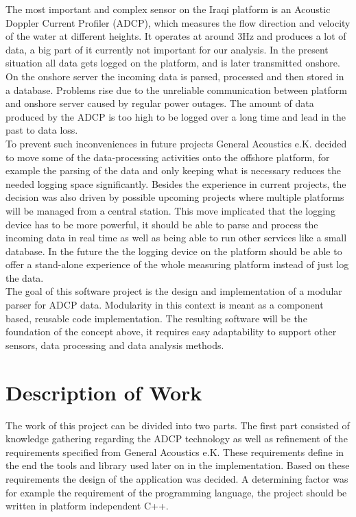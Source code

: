 The most important and complex sensor on the Iraqi platform is an Acoustic Doppler Current Profiler (ADCP), which measures the flow direction and velocity of the water at different heights. It operates at around 3Hz and produces a lot of data, a big part of it currently not important for our analysis. In the present situation all data gets logged on the platform, and is later transmitted onshore. On the onshore server the incoming data is parsed, processed and then stored in a database. Problems rise due to the unreliable communication between platform and onshore server caused by regular power outages. The amount of data produced by the ADCP is too high to be logged over a long time and lead in the past to data loss.\\\newline
To prevent such inconveniences in future projects General Acoustics e.K. decided to move some of the data-processing activities onto the offshore platform, for example the parsing of the data and only keeping what is necessary reduces the needed logging space significantly. Besides the experience in current projects, the decision was also driven by possible upcoming projects where multiple platforms will be managed from a central station. This move implicated that the logging device has to be more powerful, it should be able to parse and process the incoming data in real time as well as being able to run other services like a small database. In the future the the logging device on the platform should be able to offer a stand-alone experience of the whole measuring platform instead of just log the data.\\\newline
The goal of this software project is the design and implementation of a modular parser for ADCP data. Modularity in this context is meant as a component based, reusable code implementation. The resulting software will be the foundation of the concept above, it requires easy adaptability to support other sensors, data processing and data analysis methods. 

\section{Description of Work}
The work of this project can be divided into two parts. The first part consisted of knowledge gathering regarding the ADCP technology as well as refinement of the requirements specified from General Acoustics e.K. These requirements define in the end the tools and library used later on in the implementation. Based on these requirements the design of the application was decided. A determining factor was for example the requirement of the programming language, the project should be written in platform independent C++.

